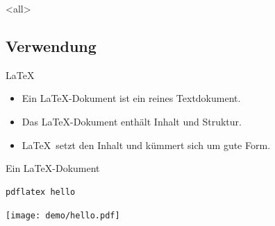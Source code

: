 \mode
<all>


\subsection{Verwendung}

\begin{Frame}[fragile]{\LaTeX}
  \begin{itemize}
    \item Ein \LaTeX-Dokument ist ein \alert{reines Textdokument}.
    \item Das \LaTeX-Dokument enthält \alert{Inhalt und Struktur}.
    \item \LaTeX\ setzt den Inhalt und kümmert sich um \alert{gute Form}.
  \end{itemize}

  \xxx
  
  \begin{center}
  \end{center}
\end{Frame}

\begin{Frame}[fragile,t]{Ein \LaTeX-Dokument}
  

  \pause
  \xxx

  \begin{lstlisting}[language={},morekeywords={pdflatex},gobble=4]
    pdflatex hello
  \end{lstlisting}

  \pause
  \xxx

  \begin{center}
    \texttt{[image: demo/hello.pdf]}
  \end{center}
\end{Frame}

